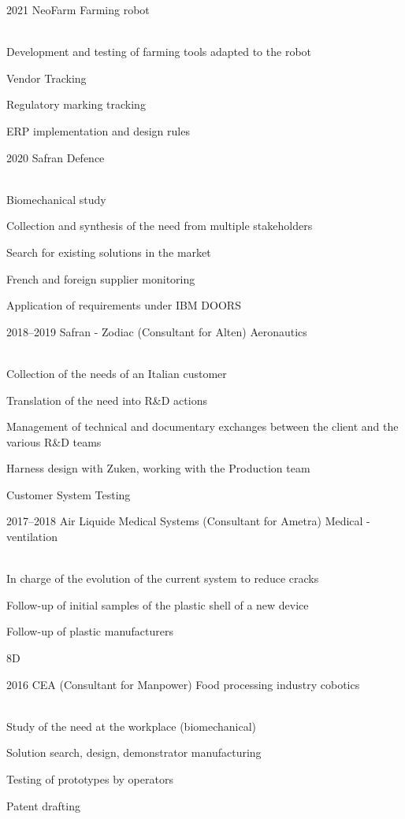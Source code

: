 \documentclass{cv-style}     %
\begin{document}
\begin{entrylist}
\entry
  {2021}
  {NeoFarm}
  {Farming robot}
  {\\
  Development and testing of farming tools adapted to the robot

  Vendor Tracking

  Regulatory marking tracking

  ERP implementation and design rules
   }
 
\entry
  {2020}
  {Safran}
  {Defence}
  {\\
  Biomechanical study

  Collection and synthesis of the need from multiple stakeholders

  Search for existing solutions in the market

  French and foreign supplier monitoring

  Application of requirements under IBM DOORS
  }
\entry
  {2018--2019}
  {Safran - Zodiac (Consultant for Alten)}
  {Aeronautics}
  {\\
  Collection of the needs of an Italian customer

  Translation of the need into R\&D actions

  Management of technical and documentary exchanges between the client and the various R\&D teams

  Harness design with Zuken, working with the Production team

  Customer System Testing
 
  }
\entry
 {2017--2018}
 {Air Liquide Medical Systems (Consultant for Ametra)}
 {Medical - ventilation}
 {\\
 In charge of the evolution of the current system to reduce cracks

 Follow-up of initial samples of the plastic shell of a new device

 Follow-up of plastic manufacturers

 8D
 }
\entry
 {2016}
 {CEA (Consultant for Manpower)}
 {Food processing industry cobotics}
 {\\
 Study of the need at the workplace (biomechanical)

 Solution search, design, demonstrator manufacturing

 Testing of prototypes by operators

 Patent drafting
 }

\end{entrylist}
\end{document}
